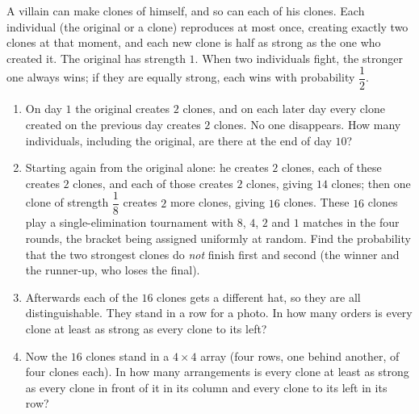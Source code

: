 A villain can make clones of himself, and so can each of his clones. Each individual (the original or a clone) reproduces at most once, creating exactly two clones at that moment, and each new clone is half as strong as the one who created it. The original has strength $1$. When two individuals fight, the stronger one always wins; if they are equally strong, each wins with probability $\dfrac12$.
\begin{enumerate}
\item[(a)] On day $1$ the original creates $2$ clones, and on each later day every clone created on the previous day creates $2$ clones. No one disappears. How many individuals, including the original, are there at the end of day $10$?
\item[(b)] Starting again from the original alone: he creates $2$ clones, each of these creates $2$ clones, and each of those creates $2$ clones, giving $14$ clones; then one clone of strength $\dfrac18$ creates $2$ more clones, giving $16$ clones. These $16$ clones play a single-elimination tournament with $8$, $4$, $2$ and $1$ matches in the four rounds, the bracket being assigned uniformly at random. Find the probability that the two strongest clones do \emph{not} finish first and second (the winner and the runner-up, who loses the final).
\item[(c)] Afterwards each of the $16$ clones gets a different hat, so they are all distinguishable. They stand in a row for a photo. In how many orders is every clone at least as strong as every clone to its left?
\item[(d)] Now the $16$ clones stand in a $4\times4$ array (four rows, one behind another, of four clones each). In how many arrangements is every clone at least as strong as every clone in front of it in its column and every clone to its left in its row?
\end{enumerate}

